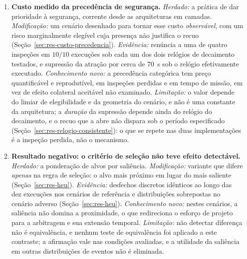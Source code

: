 \begin{enumerate}
    \item \textbf{Custo medido da precedência de segurança.} \emph{Herdado:} a prática
    de dar prioridade à segurança, corrente desde as arquiteturas em camadas.
    \emph{Modificação:} um cenário desenhado para tornar esse custo \emph{observável},
    com um risco marginalmente elegível cuja presença não justifica o recuo
    (Seção~\ref{sec:res-custo-precedencia}). \emph{Evidência:} renúncia a uma de quatro
    inspeções em $10/10$ execuções sob cada um dos dois relógios de decaimento testados,
    e supressão da atração por cerca de $70$~s sob o relógio efetivamente executado.
    \emph{Conhecimento novo:} a precedência categórica tem preço quantificável e
    reprodutível, em inspeções perdidas e em tempo de missão, em vez de efeito
    colateral aceitável não examinado. \emph{Limitação:} o valor depende do limiar de
    elegibilidade e da geometria do cenário, e não é uma constante da arquitetura; a
    \emph{duração} da supressão depende ainda do relógio do decaimento, e o recuo que a
    abre não dispara sob o período especificado
    (Seção~\ref{sec:res-relogio-consistente}): o que se repete nas duas
    implementações é a inspeção perdida, não o mecanismo.

    \item \textbf{Resultado negativo: o critério de seleção não teve efeito
    detectável.} \emph{Herdado:} a ponderação de alvos por saliência.
    \emph{Modificação:} variante que difere \emph{apenas} na regra de seleção: o alvo mais próximo em lugar do mais saliente (Seção~\ref{sec:res-heu}).
    \emph{Evidência:} desfechos discretos idênticos ao longo das dez execuções nos
    cenários de referência e distribuições sobrepostas no cenário adverso
    (Seção~\ref{sec:res-heu}). \emph{Conhecimento novo:} nestes cenários, a
    saliência não domina a proximidade, o que redireciona o esforço de projeto para a
    arbitragem e sua extensão temporal. \emph{Limitação:} não detectar diferença não é
    equivalência, e nenhum teste de equivalência foi aplicado a este contraste; a
    afirmação vale nas condições avaliadas, e a utilidade da saliência em outras
    distribuições de eventos não é eliminada.


\end{enumerate}
